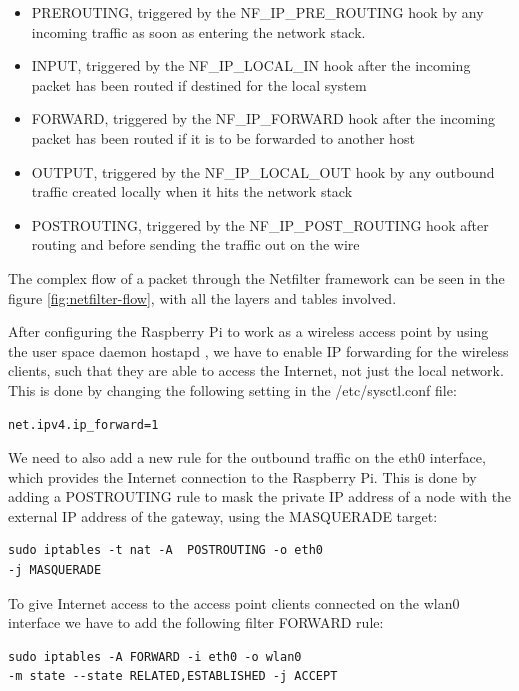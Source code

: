 \begin{itemize}
\item PREROUTING, triggered by the NF\_IP\_PRE\_ROUTING hook by any incoming traffic as soon as entering the network stack.
\item INPUT, triggered by the NF\_IP\_LOCAL\_IN hook after the incoming packet has been routed if destined for the local system
\item FORWARD, triggered by the NF\_IP\_FORWARD hook after the incoming packet has been routed if it is to be forwarded to another host
\item OUTPUT, triggered by the NF\_IP\_LOCAL\_OUT hook by any outbound traffic created locally when it hits the network stack
\item POSTROUTING, triggered by the NF\_IP\_POST\_ROUTING hook after routing and before sending the traffic out on the wire
\end{itemize}

The complex flow of a packet through the Netfilter framework can be seen in the figure \ref{fig:netfilter-flow}, with all the layers and tables involved.

After configuring the Raspberry Pi to work as a wireless access point \citep{raspberryPiAccessPoint} by using the user space daemon hostapd \citep{hostapd}, we have to enable IP forwarding for the wireless clients, such that they are able to access the Internet, not just the local network.  This is done by changing the following setting in the /etc/sysctl.conf file:

\begin{lstlisting}
net.ipv4.ip_forward=1
\end{lstlisting}

We need to also add a new rule for the outbound traffic on the eth0 interface, which provides the Internet connection to the Raspberry Pi. This is done by adding a POSTROUTING rule to mask the private IP address of a node with the external IP address of the gateway, using the MASQUERADE target: 

\begin{lstlisting}
sudo iptables -t nat -A  POSTROUTING -o eth0 
-j MASQUERADE
\end{lstlisting}

To give Internet access to the access point clients connected on the wlan0 interface we have to add the following filter FORWARD rule:

\begin{lstlisting}
sudo iptables -A FORWARD -i eth0 -o wlan0 
-m state --state RELATED,ESTABLISHED -j ACCEPT
\end{lstlisting}

